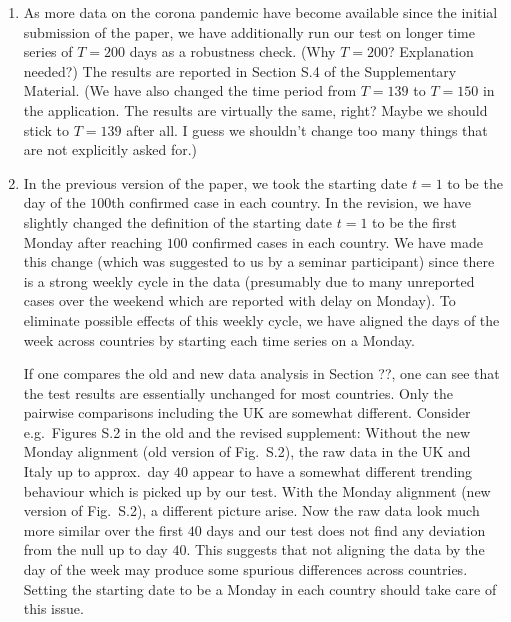 \documentclass[a4paper,12pt]{article}
\begin{document}
\begin{enumerate}[label=(\roman*), leftmargin=0.8cm]

\item As more data on the corona pandemic have become available since the initial submission of the paper, we have additionally run our test on longer time series of $T=200$ days as a robustness check. {\color{red} (Why $T=200$? Explanation needed?)}
The results are reported in Section S.4 of the Supplementary Material. {\color{red} (We have also changed the time period from $T=139$ to $T=150$ in the application. The results are virtually the same, right? Maybe we should stick to $T=139$ after all. I guess we shouldn't change too many things that are not explicitly asked for.)}  

\item In the previous version of the paper, we took the starting date $t=1$ to be the day of the $100$th confirmed case in each country. In the revision, we have slightly changed the definition of the starting date $t=1$ to be the first Monday after reaching $100$ confirmed cases in each country. We have made this change (which was suggested to us by a seminar participant) since there is a strong weekly cycle in the data (presumably due to many unreported cases over the weekend which are reported with delay on Monday). To eliminate possible effects of this weekly cycle, we have aligned the days of the week across countries by starting each time series on a Monday. 

If one compares the old and new data analysis in Section ??, one can see that the test results are essentially unchanged for most countries. Only the pairwise comparisons including the UK are somewhat different. Consider e.g.\ Figures S.2 in the old and the revised supplement: Without the new Monday alignment (old version of Fig.\ S.2), the raw data in the UK and Italy up to approx.\ day $40$ appear to have a somewhat different trending behaviour which is picked up by our test. With the Monday alignment (new version of Fig.\ S.2), a different picture arise. Now the raw data look much more similar over the first $40$ days and our test does not find any deviation from the null up to day $40$. This suggests that not aligning the data by the day of the week may produce some spurious differences across countries. Setting the starting date to be a Monday in each country should take care of this issue. 


\end{enumerate}
\end{document}
